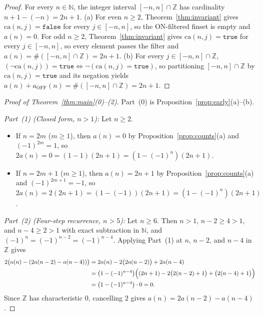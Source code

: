 \documentclass[11pt]{article}
\theoremstyle{definition}
\newcommand{\N}{\mathbb{N}}
\newcommand{\Z}{\mathbb{Z}}
\newcommand{\ca}{\mathrm{ca}}
\newcommand{\btrue}{\mathtt{true}}
\newcommand{\bfalse}{\mathtt{false}}
\begin{document}
\begin{proof}
For every $n \in \N$, the integer interval $[-n, n] \cap \Z$ has cardinality $n + 1 - (-n) = 2n + 1$.
(a) For even $n \ge 2$, Theorem~\ref{thm:invariant} gives $\ca(n, j) = \bfalse$ for every $j \in [-n, n]$, so the ON-filtered finset is empty and $a(n) = 0$. For odd $n \ge 2$, Theorem~\ref{thm:invariant} gives $\ca(n, j) = \btrue$ for every $j \in [-n, n]$, so every element passes the filter and $a(n) = \#([-n, n] \cap \Z) = 2n + 1$.
(b) For every $j \in [-n, n] \cap \Z$, $(\neg\ca(n, j)) = \btrue \iff \neg(\ca(n, j) = \btrue)$, so partitioning $[-n, n] \cap \Z$ by $\ca(n, j) = \btrue$ and its negation yields $a(n) + a_{\mathrm{OFF}}(n) = \#([-n, n] \cap \Z) = 2n + 1$.
\end{proof}

\begin{proof}[Proof of Theorem~\ref{thm:main}(0)--(2)]
Part~(0) is Proposition~\ref{prop:early}(a)--(b).

\emph{Part~(1) (Closed form, $n > 1$):} Let $n \ge 2$.
\begin{itemize}
\item If $n = 2m$ ($m \ge 1$), then $a(n) = 0$ by Proposition~\ref{prop:counts}(a) and $(-1)^{2m} = 1$, so $2a(n) = 0 = (1 - 1)(2n + 1) = (1 - (-1)^n)(2n + 1)$.
\item If $n = 2m + 1$ ($m \ge 1$), then $a(n) = 2n + 1$ by Proposition~\ref{prop:counts}(a) and $(-1)^{2m+1} = -1$, so $2a(n) = 2(2n + 1) = (1 - (-1))(2n + 1) = (1 - (-1)^n)(2n + 1)$.
\end{itemize}

\emph{Part~(2) (Four-step recurrence, $n > 5$):} Let $n \ge 6$. Then $n > 1$, $n - 2 \ge 4 > 1$, and $n - 4 \ge 2 > 1$ with exact subtraction in $\N$, and $(-1)^n = (-1)^{n-2} = (-1)^{n-4}$. Applying Part~(1) at $n$, $n - 2$, and $n - 4$ in $\Z$ gives
\begin{align*}
2\bigl(a(n) - (2a(n - 2) - a(n - 4))\bigr)
&= 2a(n) - 2\bigl(2a(n - 2)\bigr) + 2a(n - 4) \\
&= \bigl(1 - (-1)^{n-4}\bigr)\Bigl((2n + 1) - 2\bigl(2(n - 2) + 1\bigr) + \bigl(2(n - 4) + 1\bigr)\Bigr) \\
&= \bigl(1 - (-1)^{n-4}\bigr)\cdot 0 = 0.
\end{align*}
Since $\Z$ has characteristic $0$, cancelling $2$ gives $a(n) = 2a(n - 2) - a(n - 4)$.
\end{proof}
\end{document}
